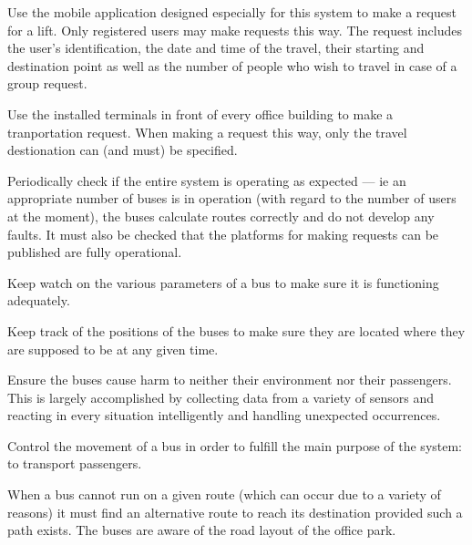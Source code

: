 \documentclass[a4paper]{article}
\begin{document}
\begin{description}[style=nextline]
	\item[Make request via mobile application]
		Use the mobile application designed especially for this system
		to make a request for a lift. Only registered users may make
		requests this way. The request includes the user's
		identification, the date and time of the travel, their starting
		and destination point as well as the number of people who wish
		to travel in case of a group request.

	\item[Make request via terminal]
		Use the installed terminals in front of every office building to
		make a tranportation request. When making a request this way,
		only the travel destionation can (and must) be specified.

	\item[Monitor system status]
		Periodically check if the entire system is operating as
		expected — ie an appropriate number of buses is in operation
		(with regard to the number of users at the moment), the buses
		calculate routes correctly and do not develop any faults. It
		must also be checked that the platforms for making requests can
		be published are fully operational.

	\item[Monitor bus condition]
		Keep watch on the various parameters of a bus to make sure it is
		functioning adequately.

	\item[Monitor bus position]
		Keep track of the positions of the buses to make sure they are
		located where they are supposed to be at any given time.

	\item[Avoid causing accidents]
		Ensure the buses cause harm to neither their environment nor
		their passengers. This is largely accomplished by collecting
		data from a variety of sensors and reacting in every situation
		intelligently and handling unexpected occurrences.

	\item[Drive bus]
		Control the movement of a bus in order to fulfill the main
		purpose of the system: to transport passengers.

	\item[Find alternative route]
		When a bus cannot run on a given route (which can occur due to a
		variety of reasons) it must find an alternative route to reach
		its destination provided such a path exists. The buses are aware
		of the road layout of the office park.


\end{description}
\end{document}
